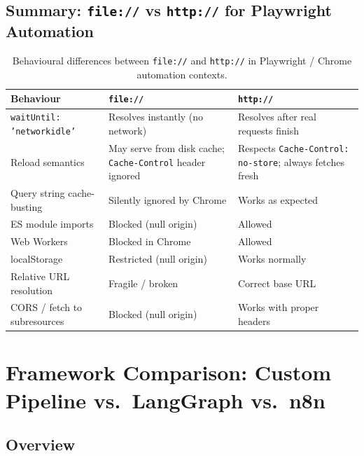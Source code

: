 \documentclass[12pt,a4paper]{article}
\begin{document}
\subsection{Summary: \texttt{file://} vs \texttt{http://} for Playwright Automation}

\begin{table}[h]
\centering\small
\begin{tabular}{@{}p{4.5cm}p{4cm}p{4cm}@{}}
\toprule
\textbf{Behaviour} & \textbf{\texttt{file://}} & \textbf{\texttt{http://}} \\
\midrule
\texttt{waitUntil: 'networkidle'} &
  Resolves instantly (no network) &
  Resolves after real requests finish \\
\addlinespace
Reload semantics &
  May serve from disk cache; \texttt{Cache-Control} header ignored &
  Respects \texttt{Cache-Control: no-store}; always fetches fresh \\
\addlinespace
Query string cache-busting &
  Silently ignored by Chrome &
  Works as expected \\
\addlinespace
ES module imports &
  Blocked (null origin) &
  Allowed \\
\addlinespace
Web Workers &
  Blocked in Chrome &
  Allowed \\
\addlinespace
localStorage &
  Restricted (null origin) &
  Works normally \\
\addlinespace
Relative URL resolution &
  Fragile / broken &
  Correct base URL \\
\addlinespace
CORS / fetch to subresources &
  Blocked (null origin) &
  Works with proper headers \\
\bottomrule
\end{tabular}
\caption{Behavioural differences between \texttt{file://} and \texttt{http://}
in Playwright / Chrome automation contexts.}
\end{table}

\section{Framework Comparison: Custom Pipeline vs.\ LangGraph vs.\ n8n}
\label{sec:comparison}

\subsection{Overview}
\end{document}
